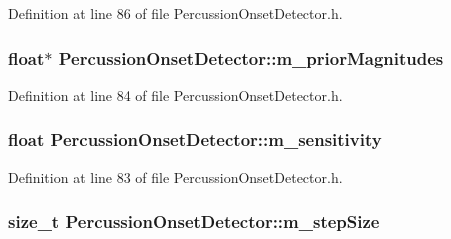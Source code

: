 Definition at line 86 of file Percussion\+Onset\+Detector.\+h.

\subsubsection[{\texorpdfstring{m\+\_\+prior\+Magnitudes}{m_priorMagnitudes}}]{\setlength{\rightskip}{0pt plus 5cm}float$\ast$ Percussion\+Onset\+Detector\+::m\+\_\+prior\+Magnitudes\hspace{0.3cm}{\ttfamily [protected]}}\hypertarget{class_percussion_onset_detector_a30daa717267251a9d49afe57c328e989}{}\label{class_percussion_onset_detector_a30daa717267251a9d49afe57c328e989}


Definition at line 84 of file Percussion\+Onset\+Detector.\+h.

\subsubsection[{\texorpdfstring{m\+\_\+sensitivity}{m_sensitivity}}]{\setlength{\rightskip}{0pt plus 5cm}float Percussion\+Onset\+Detector\+::m\+\_\+sensitivity\hspace{0.3cm}{\ttfamily [protected]}}\hypertarget{class_percussion_onset_detector_a4e9770f246ba3bc75e7fc2cb8f9010af}{}\label{class_percussion_onset_detector_a4e9770f246ba3bc75e7fc2cb8f9010af}


Definition at line 83 of file Percussion\+Onset\+Detector.\+h.

\subsubsection[{\texorpdfstring{m\+\_\+step\+Size}{m_stepSize}}]{\setlength{\rightskip}{0pt plus 5cm}size\+\_\+t Percussion\+Onset\+Detector\+::m\+\_\+step\+Size\hspace{0.3cm}{\ttfamily [protected]}}\hypertarget{class_percussion_onset_detector_aabac0cf7e961482b075777e5f0686e6c}{}\label{class_percussion_onset_detector_aabac0cf7e961482b075777e5f0686e6c}


